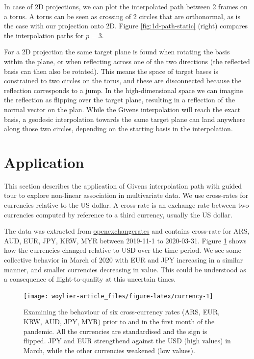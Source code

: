 In case of 2D projections, we can plot the interpolated path between 2
frames on a torus. A torus can be seen as crossing of 2 circles that are
orthonormal, as is the case with our projection onto 2D. Figure
\ref{fig:1d-path-static} (right) compares the interpolation paths for
\(p=3\).

For a 2D projection the same target plane is found when rotating the
basis within the plane, or when reflecting across one of the two
directions (the reflected basis can then also be rotated). This means
the space of target bases is constrained to two circles on the torus,
and these are disconnected because the reflection corresponds to a jump.
In the high-dimensional space we can imagine the reflection as flipping
over the target plane, resulting in a reflection of the normal vector on
the plan. While the Givens interpolation will reach the exact basis, a
geodesic interpolation towards the same target plane can land anywhere
along those two circles, depending on the starting basis in the
interpolation.

\hypertarget{application}{%
\section{Application}\label{application}}

This section describes the application of Givens interpolation path with
guided tour to explore non-linear association in multivariate data. We
use cross-rates for currencies relative to the US dollar. A cross-rate
is an exchange rate between two currencies computed by reference to a
third currency, usually the US dollar.

The data was extracted from
\href{https://openexchangerates.org}{openexchangerates} and contains
cross-rate for ARS, AUD, EUR, JPY, KRW, MYR between 2019-11-1 to
2020-03-31. Figure \ref{fig:currency} shows how the currencies changed
relative to USD over the time period. We see some collective behavior in
March of 2020 with EUR and JPY increasing in a similar manner, and
smaller currencies decreasing in value. This could be understood as a
consequence of flight-to-quality at this uncertain times.

\begin{Schunk}
\begin{figure}
\texttt{[image: woylier-article\_files/figure-latex/currency-1]} \caption[Examining the behaviour of six cross-currency rates (ARS, EUR, KRW, AUD, JPY, MYR) prior to and in the first month of the pandemic]{Examining the behaviour of six cross-currency rates (ARS, EUR, KRW, AUD, JPY, MYR) prior to and in the first month of the pandemic. All the currencies are standardised and the sign is flipped. JPY and EUR strengthend against the USD (high values) in March, while the other currencies weakened (low values).}\label{fig:currency}
\end{figure}
\end{Schunk}

